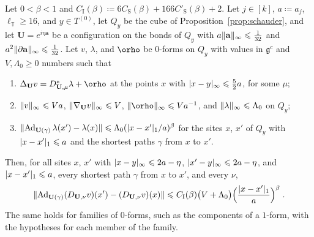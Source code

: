 \documentclass[11pt]{preprint}
\let\rho\orho
\newcommand{\Ad}{\operatorname{Ad}}
\DeclarePairedDelimiter{\abs}{\lvert}{\rvert}
\DeclarePairedDelimiter{\norm}{\lVert}{\rVert}
\numberwithin{equation}{section}
\begin{document}
\begin{proposition}\label{prop:interior-schauder}
Let $0 < \beta < 1$ and $C_{\mathrm I}(\beta) \coloneqq 6C_{\mathrm S}(\beta) + 166C'_{\mathrm S}(\beta) + 2$. Let $j \in [k]$, $a \coloneqq a_j$, $\ell_{\mathbb T} \geqslant 16$, and $y \in T^{(0)}$, let $Q_y$ be the cube of Proposition~\ref{prop:schauder}, and let $\mathbf U = e^{i\eta\mathbf a}$ be a configuration on the bonds of $Q_y$ with $a\norm{\mathbf a}_\infty \leqslant \frac{1}{32}$ and $a^2\norm{\partial\mathbf a}_\infty \leqslant \frac{1}{32}$. Let $v$, $\lambda$, and $\rho$ be $0$-forms on $Q_y$ with values in $\mathfrak g^c$ and $V, \Lambda_0 \geqslant 0$ numbers such that
\begin{enumerate}[label=(\roman*)]
\item $\Delta_{\mathbf U}v = D^*_{\mathbf U,\mu}\lambda + \rho$ at the points $x$ with $\abs{x - y}_\infty \leqslant \frac{5}{2}a$, for some $\mu$;
\item $\norm v_\infty \leqslant Va$, $\norm{\nabla_{\mathbf U}v}_\infty \leqslant V$, $\norm\rho_\infty \leqslant Va^{-1}$, and $\norm\lambda_\infty \leqslant \Lambda_0$ on $Q_y$;
\item $\norm{\Ad_{\mathbf U(\gamma)}\lambda(x') - \lambda(x)} \leqslant \Lambda_0(\abs{x - x'}_1/a)^\beta$ for the sites $x$, $x'$ of $Q_y$ with $\abs{x - x'}_1 \leqslant a$ and the shortest paths $\gamma$ from $x$ to $x'$.
\end{enumerate}
Then, for all sites $x$, $x'$ with $\abs{x - y}_\infty \leqslant 2a - \eta$, $\abs{x' - y}_\infty \leqslant 2a - \eta$, and $\abs{x - x'}_1 \leqslant a$, every shortest path $\gamma$ from $x$ to $x'$, and every $\nu$,
\begin{equation}\label{eq:interior-schauder}
    \norm{\Ad_{\mathbf U(\gamma)}(D_{\mathbf U,\nu}v)(x') - (D_{\mathbf U,\nu}v)(x)} \leqslant C_{\mathrm I}(\beta)\bigl(V + \Lambda_0\bigr)\Bigl(\frac{\abs{x - x'}_1}{a}\Bigr)^\beta\;.
\end{equation}
The same holds for families of $0$-forms, such as the components of a $1$-form, with the hypotheses for each member of the family.
\end{proposition}
\end{document}
